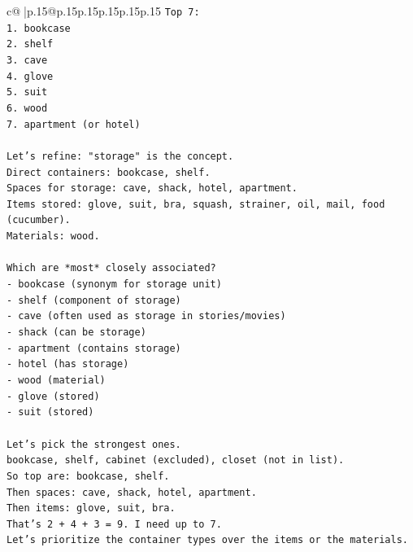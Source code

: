 \documentclass{article}
\begin{document}
{\begin{supertabular}{c@{$\;$}|p{.15\linewidth}@{}p{.15\linewidth}p{.15\linewidth}p{.15\linewidth}p{.15\linewidth}p{.15\linewidth}}
{{{\texttt{Top 7:} \\
\texttt{1. bookcase} \\
\texttt{2. shelf} \\
\texttt{3. cave} \\
\texttt{4. glove} \\
\texttt{5. suit} \\
\texttt{6. wood} \\
\texttt{7. apartment (or hotel)} \\
\\ 
\texttt{Let's refine: "storage" is the concept.} \\
\texttt{Direct containers: bookcase, shelf.} \\
\texttt{Spaces for storage: cave, shack, hotel, apartment.} \\
\texttt{Items stored: glove, suit, bra, squash, strainer, oil, mail, food (cucumber).} \\
\texttt{Materials: wood.} \\
\\ 
\texttt{Which are *most* closely associated?} \\
\texttt{{-} bookcase (synonym for storage unit)} \\
\texttt{{-} shelf (component of storage)} \\
\texttt{{-} cave (often used as storage in stories/movies)} \\
\texttt{{-} shack (can be storage)} \\
\texttt{{-} apartment (contains storage)} \\
\texttt{{-} hotel (has storage)} \\
\texttt{{-} wood (material)} \\
\texttt{{-} glove (stored)} \\
\texttt{{-} suit (stored)} \\
\\ 
\texttt{Let's pick the strongest ones.} \\
\texttt{bookcase, shelf, cabinet (excluded), closet (not in list).} \\
\texttt{So top are: bookcase, shelf.} \\
\texttt{Then spaces: cave, shack, hotel, apartment.} \\
\texttt{Then items: glove, suit, bra.} \\
\texttt{That's 2 + 4 + 3 = 9. I need up to 7.} \\
\texttt{Let's prioritize the container types over the items or the materials.} \\
}}}
\end{supertabular}}
\end{document}
